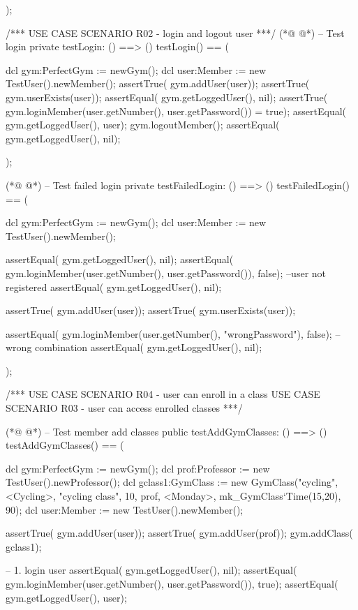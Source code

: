 \begin{vdmpp}[breaklines=true]
 );
  
  /*** USE CASE SCENARIO R02 - login and logout user ***/
(*@
\label{testLogin:242}
@*)
  -- Test login
  private testLogin: () ==> ()
 testLogin() == (
  
   dcl gym:PerfectGym := newGym();
   dcl user:Member := new TestUser().newMember(); 
   assertTrue( gym.addUser(user));
   assertTrue( gym.userExists(user));
   assertEqual( gym.getLoggedUser(), nil); 
   assertTrue( gym.loginMember(user.getNumber(), user.getPassword()) = true);
   assertEqual( gym.getLoggedUser(), user); 
    gym.logoutMember();
    assertEqual( gym.getLoggedUser(), nil); 
   
 );
 
(*@
\label{testFailedLogin:258}
@*)
 -- Test failed login
  private testFailedLogin: () ==> ()
 testFailedLogin() == (
    
    dcl gym:PerfectGym := newGym(); 
   dcl user:Member := new TestUser().newMember(); 
   
   assertEqual( gym.getLoggedUser(), nil); 
   assertEqual( gym.loginMember(user.getNumber(), user.getPassword()), false); --user not registered
   assertEqual( gym.getLoggedUser(), nil); 
   
   assertTrue( gym.addUser(user));
   assertTrue( gym.userExists(user));

   assertEqual( gym.loginMember(user.getNumber(), "wrongPassword"), false);   --wrong combination
   assertEqual( gym.getLoggedUser(), nil); 
  
 );
 
 
 /*** USE CASE SCENARIO R04 - user can enroll in a class
       USE CASE SCENARIO R03 - user can access enrolled classes ***/
 
(*@
\label{testAddGymClasses:281}
@*)
 -- Test member add classes
 public testAddGymClasses: () ==> ()
 testAddGymClasses() == (
 
   dcl gym:PerfectGym := newGym();
  dcl prof:Professor := new TestUser().newProfessor();
  dcl gclass1:GymClass := new GymClass("cycling", <Cycling>, "cycling class", 10, prof, <Monday>, mk_GymClass`Time(15,20), 90);
  dcl user:Member := new TestUser().newMember(); 
  
  assertTrue( gym.addUser(user));
  assertTrue( gym.addUser(prof));
  gym.addClass( gclass1); 
  
  
  -- 1. login user
  assertEqual( gym.getLoggedUser(), nil); 
  assertEqual( gym.loginMember(user.getNumber(), user.getPassword()), true);
  assertEqual( gym.getLoggedUser(), user);
  

\end{vdmpp}
